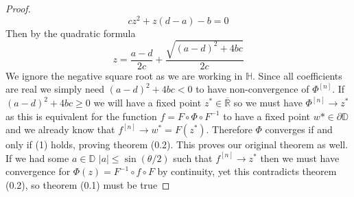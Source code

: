 \documentclass{article}
\newcommand{\R}{\mathbb{R}}
\newcommand{\DD}{\mathbb{D}}
\newcommand{\HH}{\mathbb{H}}
\newcommand{\ov}{\overline}
\begin{document}
\begin{proof}
\begin{equation*}
        cz^2+z(d-a)-b=0
\end{equation*}
Then by the quadratic formula
\begin{equation*}
        z = \frac{a-d}{2c} + \frac{\sqrt{(a-d)^2+4bc}}{2c}
\end{equation*}
We ignore the negative square root as we are working in $\HH$. Since all coefficients are real we simply need $(a-d)^2+4bc<0$ to have non-convergence of $\Phi^{[n]}$. If $(a-d)^2+4bc\geq0$ we will have a fixed point $z^*\in\ov{\R}$ so we must have $\Phi^{[n]}\to z^*$ as this is equivalent for the function $f = F\circ\Phi\circ F^{-1}$ to have a fixed point $w*\in\partial\DD$ and we already know that $f^{[n]}\to w^*=F(z^*)$. Therefore $\Phi$ converges if and only if (1) holds, proving theorem (0.2). This proves our original theorem as well. If we had some $a\in\DD$ $|a|\leq\sin(\theta/2)$ such that $f^{[n]}\to z^*$ then we must have convergence for $\Phi(z) = F^{-1}\circ f \circ F$ by continuity, yet this contradicts theorem (0.2), so theorem (0.1) must be true
\end{proof}
\end{document}
